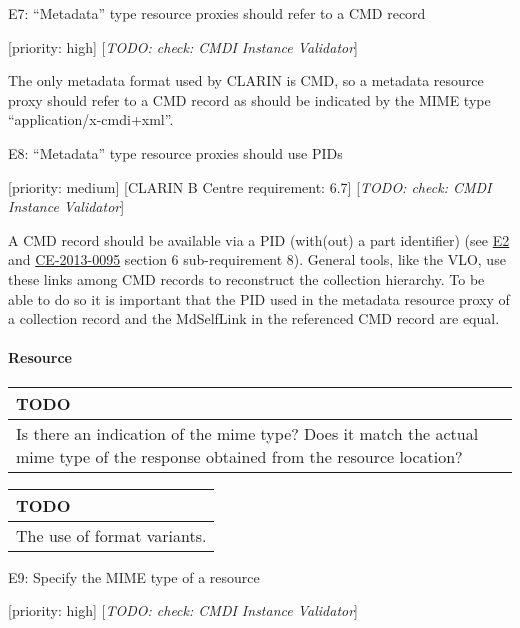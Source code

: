 E7: ``Metadata'' type resource proxies should refer to a CMD record

{[}priority: high{]} {[}\emph{TODO: check: CMDI Instance Validator}{]}

The only metadata format used by CLARIN is CMD, so a metadata resource
proxy should refer to a CMD record as should be indicated by the MIME
type ``application/x-cmdi+xml''.

E8: ``Metadata'' type resource proxies should use PIDs

{[}priority: medium{]} {[}CLARIN B Centre requirement: 6.7{]}
{[}\emph{TODO: check: CMDI Instance Validator}{]}

A CMD record should be available via a PID (with(out) a part identifier)
(see
\protect\hyperlink{e2-the-mdselflink-should-be-a-persistent-identifier-pid}{E2}
and \href{http://hdl.handle.net/1839/00-DOCS.CLARIN.EU-78}{CE-2013-0095}
section 6 sub-requirement 8). General tools, like the VLO, use these
links among CMD records to reconstruct the collection hierarchy. To be
able to do so it is important that the PID used in the metadata resource
proxy of a collection record and the MdSelfLink in the referenced CMD
record are equal.

\paragraph{Resource}\label{resource}

\begin{longtable}[c]{@{}l@{}}
\toprule
\begin{minipage}[b]{0.05\columnwidth}\raggedright\strut
TODO
\strut\end{minipage}\tabularnewline
\midrule
\endhead
\begin{minipage}[t]{0.05\columnwidth}\raggedright\strut
Is there an indication of the mime type? Does it match the actual mime
type of the response obtained from the resource location?
\strut\end{minipage}\tabularnewline
\bottomrule
\end{longtable}

\begin{longtable}[c]{@{}l@{}}
\toprule
TODO\tabularnewline
\midrule
\endhead
The use of format variants.\tabularnewline
\bottomrule
\end{longtable}

E9: Specify the MIME type of a resource

{[}priority: high{]} {[}\emph{TODO: check: CMDI Instance Validator}{]}

